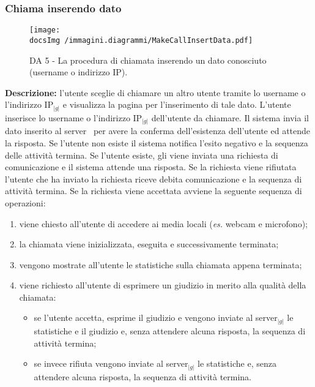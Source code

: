 		
		
		\subsubsection{Chiama inserendo dato}
		\begin{center}
			\begin{figure}[htbp]
				\centering
				\texttt{[image: \\docsImg /immagini.diagrammi/MakeCallInsertData.pdf]}
			\caption{DA 5 - La procedura di chiamata inserendo un dato conosciuto (username o indirizzo IP).}	
			\end{figure}
		\end{center}		
		\noindent \textbf{Descrizione: }l'utente sceglie di chiamare un altro utente tramite lo username o l'indirizzo IP$_{|g|}$ e visualizza la pagina per l'inserimento di tale dato.
		L'utente inserisce lo username o l'indirizzo IP$_{|g|}$ dell'utente da chiamare. Il sistema invia il dato inserito al server\g~ per avere la conferma dell'esistenza dell'utente ed attende la risposta.
		Se l'utente non esiste il sistema notifica l'esito negativo e la sequenza delle attività termina.
		Se l'utente esiste, gli viene inviata una richiesta di comunicazione e il sistema attende una risposta. Se la richiesta viene rifiutata l'utente che ha inviato la richiesta riceve debita comunicazione e la sequenza di attività termina.
		Se la richiesta viene accettata avviene la seguente sequenza di operazioni:
		\begin{enumerate}
			\item viene chiesto all'utente di accedere ai media locali (\textit{es.} webcam e microfono);
			\item la chiamata viene inizializzata, eseguita e successivamente terminata;
			\item vengono mostrate all'utente le statistiche sulla chiamata appena terminata;
			\item viene richiesto all'utente di esprimere un giudizio in merito alla qualità della chiamata:
			\begin{itemize}
			\item se l'utente accetta, esprime il giudizio e vengono inviate al server$_{|g|}$ le statistiche e il giudizio e, senza attendere alcuna risposta, la sequenza di attività termina;
			\item se invece rifiuta vengono inviate al server$_{|g|}$ le statistiche e, senza attendere alcuna risposta, la sequenza di attività termina.
			\end{itemize}
		\end{enumerate}
		\newpage
		
